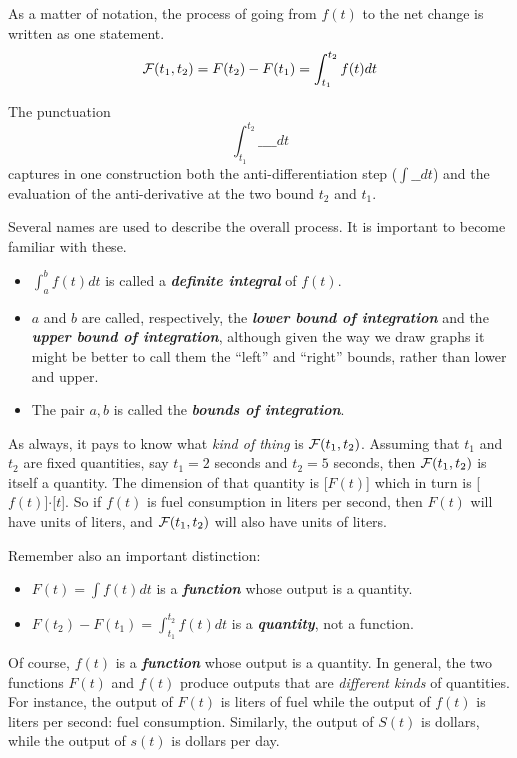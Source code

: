 \documentclass[
  letterpaper,
  DIV=11,
  numbers=noendperiod,
  oneside]{scrreprt}
\providecommand{\tightlist}{%
  \setlength{\itemsep}{0pt}\setlength{\parskip}{0pt}}
\begin{document}
As a matter of notation, the process of going from \(f(t)\) to the net
change is written as one statement.
\[{\cal F}(t_1, t_2) = F(t_2) - F(t_1) = \int_{t_1}^{t_2} f(t) dt\]

The punctuation \[\int_{t_1}^{t_2} \_\_\_\_ dt\] captures in one
construction both the anti-differentiation step (\(\int\_\_dt\)) and the
evaluation of the anti-derivative at the two bound \(t_2\) and \(t_1\).

Several names are used to describe the overall process. It is important
to become familiar with these.

\begin{itemize}
\tightlist
\item
  \(\int_a^b f(t) dt\) is called a \textbf{\emph{definite integral}} of
  \(f(t)\).
\item
  \(a\) and \(b\) are called, respectively, the \textbf{\emph{lower
  bound of integration}} and the \textbf{\emph{upper bound of
  integration}}, although given the way we draw graphs it might be
  better to call them the ``left'' and ``right'' bounds, rather than
  lower and upper.
\item
  The pair \(a, b\) is called the \textbf{\emph{bounds of integration}}.
\end{itemize}

As always, it pays to know what \emph{kind of thing} is
\({\cal F}(t_1, t_2)\). Assuming that \(t_1\) and \(t_2\) are fixed
quantities, say \(t_1 = 2\) seconds and \(t_2 = 5\) seconds, then
\({\cal F}(t_1, t_2)\) is itself a quantity. The dimension of that
quantity is {[}\(F(t)\){]} which in turn is
{[}\(f(t)\){]}\(\cdot\){[}\(t\){]}. So if \(f(t)\) is fuel consumption
in liters per second, then \(F(t)\) will have units of liters, and
\({\cal F}(t_1, t_2)\) will also have units of liters.

Remember also an important distinction:

\begin{itemize}
\tightlist
\item
  \(F(t) = \int f(t) dt\) is a \textbf{\emph{function}} whose output is
  a quantity.
\item
  \(F(t_2) - F(t_1) = \int_{t_1}^{t_2} f(t) dt\) is a
  \textbf{\emph{quantity}}, not a function.
\end{itemize}

Of course, \(f(t)\) is a \textbf{\emph{function}} whose output is a
quantity. In general, the two functions \(F(t)\) and \(f(t)\) produce
outputs that are \emph{different kinds} of quantities. For instance, the
output of \(F(t)\) is liters of fuel while the output of \(f(t)\) is
liters per second: fuel consumption. Similarly, the output of \(S(t)\)
is dollars, while the output of \(s(t)\) is dollars per day.
\end{document}

